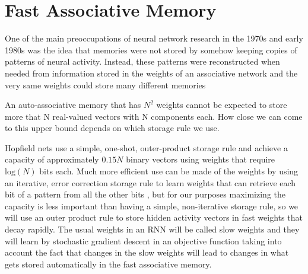 \documentclass{article}
\begin{document}
\section{Fast Associative Memory}

One of the main preoccupations of neural network research in the 1970s and early 1980s \citep{willshaw1969non, kohonen1972correlation, anderson1981models, hopfield1982neural} was the idea that memories were not stored by somehow keeping copies of patterns of neural activity.  Instead, these patterns  were reconstructed when needed from information stored in the weights of an associative network and the very same weights could store many different memories

 
An auto-associative memory that has $N^2$ weights cannot be expected to store more that N real-valued vectors with N components each.   How close we can come to this upper bound depends on which storage rule we use. 

Hopfield nets use a simple, one-shot, outer-product storage rule and achieve a capacity of approximately $0.15N$ binary vectors using weights that require $\text{log}(N)$ bits each.  Much more efficient use can be made of the weights by using an iterative, error correction storage rule to learn weights that can retrieve each bit of a pattern from all the other bits \citep{gardner1988space}, but for our purposes maximizing the capacity is less important than having a simple, non-iterative storage rule, so we will use an outer product rule to store hidden activity vectors in fast weights that decay rapidly.  The usual weights in an RNN will be called slow weights and they will learn by stochastic gradient descent in an objective function taking into account the fact that changes in the slow weights will lead to changes in what gets stored automatically in the fast associative memory.
\end{document}
